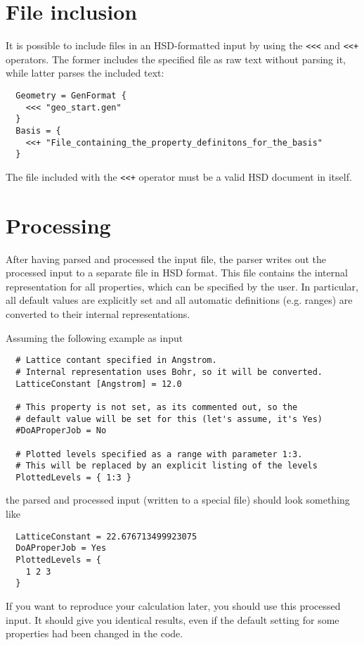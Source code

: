 \section{File inclusion}

It is possible to include files in an HSD-formatted input by using the
\verb|<<<| and \verb|<<+| operators. The former includes the specified
file as raw text without parsing it, while latter parses the included
text:
\begin{verbatim}
  Geometry = GenFormat {
    <<< "geo_start.gen"
  }
  Basis = {
    <<+ "File_containing_the_property_definitons_for_the_basis"
  }
\end{verbatim}
The file included with the \verb|<<+| operator must be a valid HSD
document in itself.


\section{Processing}

After having parsed and processed the input file, the parser writes
out the processed input to a separate file in HSD format. This file
contains the internal representation for all properties, which can be
specified by the user. In particular, all default values are explicitly
set and all automatic definitions (e.g. ranges) are converted to their
internal representations.

Assuming the following example as input
\begin{verbatim}
  # Lattice contant specified in Angstrom.
  # Internal representation uses Bohr, so it will be converted.
  LatticeConstant [Angstrom] = 12.0

  # This property is not set, as its commented out, so the
  # default value will be set for this (let's assume, it's Yes)
  #DoAProperJob = No

  # Plotted levels specified as a range with parameter 1:3.
  # This will be replaced by an explicit listing of the levels
  PlottedLevels = { 1:3 }
\end{verbatim}
the parsed and processed input (written to a special file) should look
something like
\begin{verbatim}
  LatticeConstant = 22.676713499923075
  DoAProperJob = Yes
  PlottedLevels = {
    1 2 3
  }
\end{verbatim}
If you want to reproduce your calculation later, you should use this
processed input. It should give you identical results, even if the
default setting for some properties had been changed in the code.

